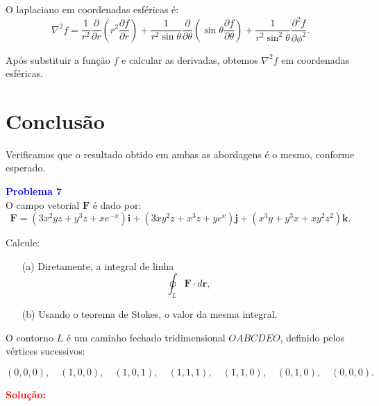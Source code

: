 \documentclass[a4paper,12pt]{article}
\begin{document}
\begin{flushleft}
O laplaciano em coordenadas esféricas é:
\begin{equation}
\nabla^2 f = \frac{1}{r^2} \frac{\partial}{\partial r}\left(r^2 \frac{\partial f}{\partial r}\right) + \frac{1}{r^2 \sin\theta} \frac{\partial}{\partial \theta}\left(\sin\theta \frac{\partial f}{\partial \theta}\right) + \frac{1}{r^2 \sin^2\theta} \frac{\partial^2 f}{\partial \phi^2}.
\end{equation}

Após substituir a função $f$ e calcular as derivadas, obtemos $\nabla^2 f$ em coordenadas esféricas.

\section{Conclusão}
Verificamos que o resultado obtido em ambas as abordagens é o mesmo, conforme esperado.

\end{flushleft}

\begin{flushleft}
\textbf{\textcolor{blue}{Problema 7}}\\

O campo vetorial \( \mathbf{F} \) é dado por:
\[
\mathbf{F} = (3x^2yz + y^3z + xe^{-x}) \mathbf{i} + (3xy^2z + x^3z + ye^x) \mathbf{j} + (x^3y + y^3x + xy^2z^2) \mathbf{k}.
\]

Calcule:
\begin{itemize}
    \item[(a)] Diretamente, a integral de linha 
    \[
    \oint_L \mathbf{F} \cdot d\mathbf{r},
    \]
    \item[(b)] Usando o teorema de Stokes, o valor da mesma integral.
\end{itemize}

O contorno \( L \) é um caminho fechado tridimensional \( OABCDEO \), definido pelos vértices sucessivos:

\[
(0,0,0), \quad (1,0,0), \quad (1,0,1), \quad (1,1,1), \quad (1,1,0), \quad (0,1,0), \quad (0,0,0).
\]

\textcolor{red}{\textbf{Solução:}}\\


\end{flushleft}
\end{document}
